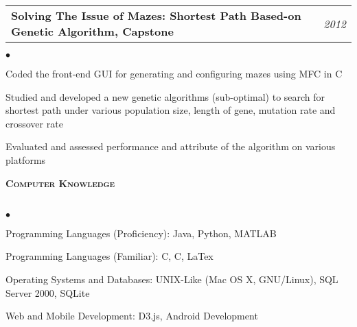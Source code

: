 \documentclass[11pt]{article}
\makeatletter
\newcommand{\lineunder}{\vspace*{-8pt} \\ \hspace*{-18pt} \hrulefill \\}
\newcommand{\header}[1]{{\hspace*{-15pt}\vspace*{6pt} \large \textsc{\textbf{#1}}} \vspace*{-6pt} \lineunder}
\newenvironment{achievements}{\begin{list}{$\bullet$}{\topsep 0pt \itemsep -2pt}}{\vspace*{4pt}\end{list}}
\newcommand{\headerrow}[2]
{\begin{tabular*}{\linewidth}{l@{\extracolsep{\fill}}r}
	\hspace*{-15pt}#1 & #2 \\
\end{tabular*}}
\newcommand{\CPP}
 {C\nolinebreak[4]\hspace{-.05em}\raisebox{.22ex}{\footnotesize\bf ++}}
\makeatother
\begin{document}
\headerrow
{\textbf{Solving The Issue of Mazes: Shortest Path Based-on Genetic Algorithm, Capstone}}
{\emph{2012}}
	\begin{achievements}
  \item Coded the front-end GUI for generating and configuring mazes using MFC in \CPP
  \item Studied and developed a new genetic algorithms (sub-optimal) to search for shortest path under various population size, length of gene,  mutation rate and crossover rate
  \item Evaluated and assessed performance and attribute of the algorithm on various platforms
  \end{achievements}


\vspace*{2.5pt}
\header{Computer Knowledge}
\begin{achievements}
\item Programming Languages (Proficiency): Java, Python, MATLAB
\item Programming Languages (Familiar):  C, \CPP,  LaTex
\item Operating Systems and Databases: UNIX-Like (Mac OS X, GNU/Linux), SQL Server 2000, SQLite
\item Web and Mobile Development: D3.js, Android Development
\end{achievements}
\end{document}
